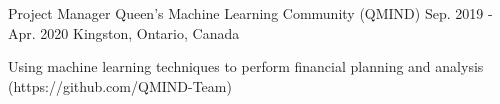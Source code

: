 
\begin{cventries}



  \cventry
    {Project Manager} %
    {Queen's Machine Learning Community (QMIND)} %
    {Sep. 2019 - Apr. 2020} %
    {Kingston, Ontario, Canada} %
    {
      \begin{cvitems} %
        \item {Using machine learning techniques to perform financial planning and analysis
(https://github.com/QMIND-Team)}
      \end{cvitems}
    }


\end{cventries}
